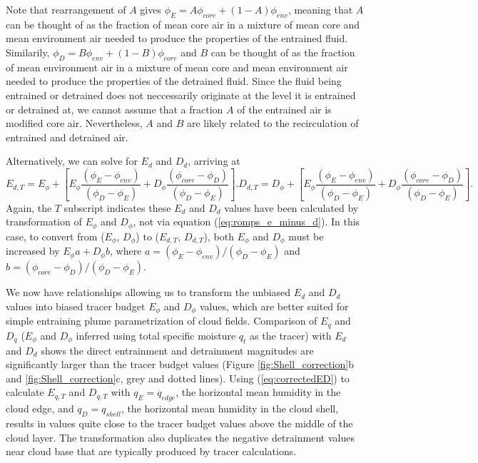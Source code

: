 \documentclass[12pt]{article}
\begin{document}
Note that rearrangement of $A$ gives 
$\phi_E = A \phi_{core} + (1-A)\phi_{env}$, meaning that $A$ can be 
thought of as the fraction of mean core air in a mixture of mean 
core and mean environment air needed to produce the properties of the 
entrained fluid.  Similarily, $\phi_D = B \phi_{env} + (1-B)\phi_{core}$ 
and $B$ can be thought of as the fraction of mean environment air in a 
mixture of mean core and mean environment air needed to produce the 
properties of the detrained fluid.  Since the fluid being entrained or 
detrained does not neccessarily originate at the level it is entrained 
or detrained at, we cannot assume that a fraction $A$ of the entrained 
air is modified core air.  Nevertheless, $A$ and $B$ are likely related 
to the recirculation of entrained and detrained air.

Alternatively, we can solve for $E_d$ and $D_d$, arriving at
\begin{subequations}
\begin{equation}
  \label{eq:corrected_entrainment2}
    E_{d,T} = E_{\phi}
        + \left[E_{\phi}\frac{(\phi_E - \phi_{env})}
                               {(\phi_D - \phi_E)} 
              + D_{\phi}\frac{(\phi_{core} - \phi_D)}
                               {(\phi_D - \phi_E)}\right].
\end{equation}
\begin{equation}
  \label{eq:corrected_detrainment2}
    D_{d,T} = D_{\phi} 
        + \left[E_{\phi}\frac{(\phi_E - \phi_{env})}
                               {(\phi_D - \phi_E)}
              + D_{\phi}\frac{(\phi_{core} - \phi_D)}
                               {(\phi_D - \phi_E)}\right].
\end{equation}
\end{subequations}
Again, the $T$ subscript indicates these $E_d$ and $D_d$ values have 
been calculated by transformation of $E_{\phi}$ and $D_{\phi}$, not 
via equation (\ref{eq:romps_e_minus_d}).  In this case, to convert from 
($E_{\phi}$, $D_{\phi}$) to ($E_{d,T}$, $D_{d,T}$), both $E_{\phi}$ and 
$D_{\phi}$ must be increased by $E_{\phi} a + D_{\phi} b$, where 
$a = (\phi_E - \phi_{env})/(\phi_D - \phi_E)$ and 
$b = (\phi_{core} -\phi_D)/(\phi_D - \phi_E)$.

We now have relationships allowing us to transform the unbiased
$E_d$ and $D_d$ values into biased tracer budget
$E_{\phi}$ and $D_{\phi}$ values, which are better suited for
simple entraining plume parametrization of cloud fields.
Comparison of $E_q$ and $D_q$ ($E_{\phi}$ and $D_{\phi}$ inferred
using total specific moisture $q_t$ as the tracer) with $E_d$ and $D_d$
shows the direct entrainment and detrainment magnitudes are significantly larger 
than the tracer budget values (Figure \ref{fig:Shell_correction}b 
and \ref{fig:Shell_correction}c, grey and dotted lines).  
Using (\ref{eq:correctedED}) to calculate $E_{q,T}$ and $D_{q,T}$ with
$q_E = q_{edge}$, the horizontal mean humidity in the cloud edge, and 
$q_D = q_{shell}$, the horizontal mean humidity in the cloud shell, 
results in values quite close to the tracer budget values above the 
middle of the cloud layer. The transformation also duplicates the 
negative detrainment values near cloud base that are typically produced 
by tracer calculations.
\end{document}
